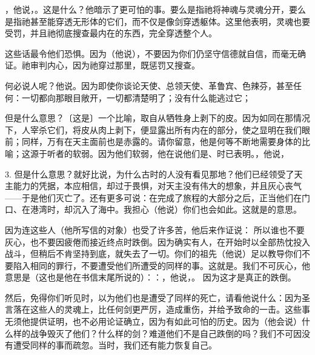 ，他说，。这是什么？他暗示了更可怕的事。要么是指祂将神魂与灵魂分开，要么是指祂甚至能穿透无形体的它们，而不仅是像剑穿透躯体。这里他表明，灵魂也要受罚，并且祂彻底搜查最内在的东西，完全穿透整个人。\par

 这些话最令他们恐惧。因为（他说），不要因为你们仍坚守信德就自信，而毫无确证。祂审判内心，因为祂穿过那里，既惩罚又搜查。\par

何必说人呢？他说。因为即使你谈论天使、总领天使、革鲁宾、色辣芬，甚至任何：一切都向那眼目敞开，一切都清楚明了；没有什么能逃过它；\par

但是什么意思？〔这是〕一个比喻，取自从牺牲身上剥下的皮。因为如同在那情况下，人宰杀它们，将皮从肉上剥下，便显露出所有内在的部分，使之显明在我们眼前；同样，万有在天主面前也是赤露的。请你留意，他是何等不断地需要身体的比喻；这源于听者的软弱。因为他们软弱，他在说他们是、时已表明。，他说， \par

3. 但是什么意思？就好比说，为什么古时的人没有看见那地？他们已经领受了天主能力的凭据，本应相信，却过于畏惧，对天主没有伟大的想象，并且灰心丧气——于是他们灭亡了。还有更多可说：在完成了旅程的大部分之后，正当他们在门口、在港湾时，却沉入了海中。我担心（他说）你们也会如此。这就是的意思。\par

因为连这些人（他所写信的对象）也受了许多苦，他后来作证说： 所以谁也不要灰心，也不要因疲倦而接近终点时跌倒。因为确实有人，在开始时以全部热忱投入战斗，但稍后不肯坚持到底，就失去了一切。你们的祖先（他说）足以教导你们不要陷入相同的罪行，不要遭受他们所遭受的同样的事。这就是。我们不可灰心，他意思是（这也是他在书信末尾所说的）：：，他说，。 因为这才是真正的跌倒。\par

然后，免得你们听见时，以为他们也是遭受了同样的死亡，请看他说什么：因为圣言落在这些人的灵魂上，比任何剑更严厉，造成重伤，并给予致命的一击。这些事无须他提供证明，也不必用论证确立，因为有如此可怕的历史。因为（他会说）什么样的战争毁灭了他们？什么样的剑？难道他们不是自己跌倒的吗？我们不可因没有遭受同样的事而疏忽。当时，我们还有能力恢复自己。\par

